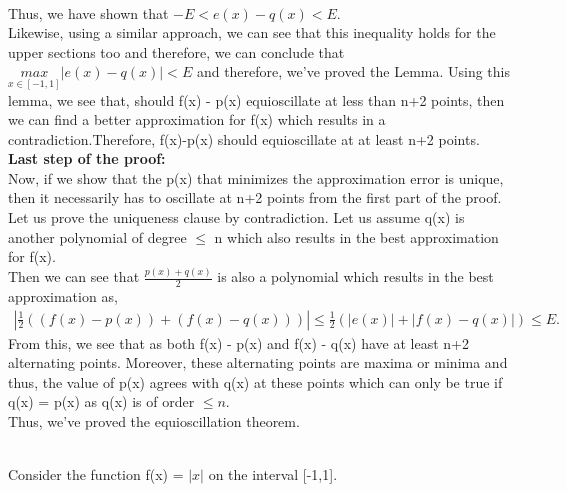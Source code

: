 \documentclass[letterpaper]{exam}
\begin{document}
\begin{questions}
\begin{solution}
\begin{align*}
\end{align*}
Thus, we have shown that $-E < e(x) - q(x) < E$. \\
Likewise, using a similar approach, we can see that this inequality holds for the upper sections too and therefore, we can conclude that $\underset{x \in [-1,1]}{max } \left|e(x) - q(x) \right| < E$ and therefore, we've proved the Lemma. 
Using this lemma, we see that, should f(x) - p(x) equioscillate at less than n+2 points, then we can find a better approximation for f(x) which results in a contradiction.Therefore, f(x)-p(x) should equioscillate at at least n+2 points.\\
\textbf{Last step of the proof:}\\
Now, if we show that the p(x) that minimizes the approximation error is unique, then it necessarily has to oscillate at n+2 points from the first part of the proof.\\
Let us prove the uniqueness clause by contradiction. Let us assume q(x) is another polynomial of degree $\leq$ n which also results in the best approximation for f(x).\\
Then we can see that $\frac{p(x) + q(x)}{2}$ is also a polynomial which results in the best approximation as,
\begin{align*}
    \left|\frac{1}{2}\left(\left(f(x) - p(x)\right)+\left(f(x) - q(x)\right)\right)\right| \leq \frac{1}{2}\left(\left|e(x)\right| + \left|f(x) - q(x) \right| \right) \leq E.
\end{align*}
From this, we see that as both f(x) - p(x) and f(x) - q(x) have at least n+2 alternating points. Moreover, these alternating points are maxima or minima and thus, the value of p(x) agrees with q(x) at these points which can only be true if q(x) = p(x) as q(x) is of order $\leq n$.\\
Thus, we've proved the equioscillation theorem.
\end{solution}
\\
Consider the function f(x) = $\left|x\right|$ on the interval [-1,1].
\begin{parts}

\end{parts}
\end{questions}
\end{document}
